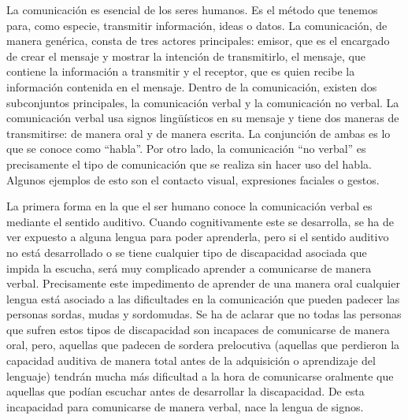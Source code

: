\documentclass{article} %
\begin{document}
\noindent La comunicaci\'{o}n es esencial de los seres humanos. Es el m\'{e}todo que tenemos para, como especie, transmitir informaci\'{o}n, ideas o datos. La comunicaci\'{o}n, de manera gen\'{e}rica, consta de tres actores principales: emisor, que es el encargado de crear el mensaje y mostrar la intenci\'{o}n de transmitirlo, el mensaje, que contiene la informaci\'{o}n a transmitir y el receptor, que es quien recibe la informaci\'{o}n contenida en el mensaje. Dentro de la comunicaci\'{o}n, existen dos subconjuntos principales, la comunicaci\'{o}n verbal y la comunicaci\'{o}n no verbal. La comunicaci\'{o}n verbal usa signos ling\"{u}\'{i}sticos en su mensaje y tiene dos maneras de transmitirse: de manera oral y de manera escrita. La conjunci\'{o}n de ambas es lo que se conoce como ``habla''. Por otro lado, la comunicaci\'{o}n ``no verbal'' es precisamente el tipo de comunicaci\'{o}n que se realiza sin hacer uso del habla. Algunos ejemplos de esto son el contacto visual, expresiones faciales o gestos.

\noindent La primera forma en la que el ser humano conoce la comunicaci\'{o}n verbal es mediante el sentido auditivo. Cuando cognitivamente este se desarrolla, se ha de ver expuesto a alguna lengua para poder aprenderla, pero si el sentido auditivo no est\'{a} desarrollado o se tiene cualquier tipo de discapacidad asociada que impida la escucha, ser\'{a} muy complicado aprender a comunicarse de manera verbal. Precisamente este impedimento de aprender de una manera oral cualquier lengua est\'{a} asociado a las dificultades en la comunicaci\'{o}n que pueden padecer las personas sordas, mudas y sordomudas.  Se ha de aclarar que no todas las personas que sufren estos tipos de discapacidad son incapaces de comunicarse de manera oral, pero, aquellas que padecen de sordera prelocutiva (aquellas que perdieron la capacidad auditiva de manera total antes de la adquisici\'{o}n o aprendizaje del lenguaje) tendr\'{a}n mucha m\'{a}s dificultad a la hora de comunicarse oralmente que aquellas que pod\'{i}an escuchar antes de desarrollar la discapacidad. De esta incapacidad para comunicarse de manera verbal, nace la lengua de signos.
\end{document}
